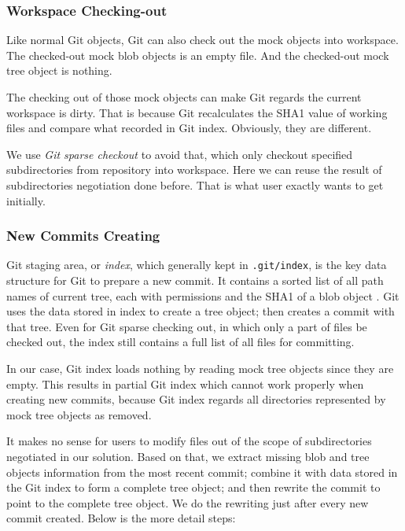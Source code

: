 \documentclass[preprint]{sigplanconf}
\begin{document}
\subsubsection{Workspace Checking-out}
Like normal Git objects, Git can also check out the mock objects into workspace.
The checked-out mock blob objects is an empty file.
And the checked-out mock tree object is nothing.

The checking out of those mock objects can make Git regards the current
workspace is dirty.
That is because Git recalculates the SHA1 value of working files and compare
what recorded in Git index.
Obviously, they are different.

We use \emph{Git sparse checkout} \cite{sparseco} to avoid that, which only
checkout specified subdirectories from repository into workspace.
Here we can reuse the result of subdirectories negotiation done before.
That is what user exactly wants to get initially.



\subsubsection{New Commits Creating}\label{sec:create-new-commit}
Git staging area, or \emph{index}, which generally kept in \verb|.git/index|,
is the key data structure for Git to prepare a new commit.
It contains a sorted list of all path names of current tree, each with
permissions and the SHA1 of a blob object \cite{idx-format}.
Git uses the data stored in index to create a tree object; then creates a
commit with that tree.
Even for Git sparse checking out, in which only a part of files be checked
out, the index still contains a full list of all files for committing.

In our case, Git index loads nothing by reading mock tree objects
since they are empty.
This results in partial Git index which cannot work properly when creating new
commits, because Git index regards all directories represented by mock tree
objects as removed.

It makes no sense for users to modify files out of the scope of
subdirectories negotiated in our solution.
Based on that, we extract missing blob and tree objects information from the
most recent commit; combine it with data stored in the Git index to form a
complete tree object; and then rewrite the commit to point to the complete tree
object.
We do the rewriting just after every new commit created.
Below is the more detail steps:
\end{document}
